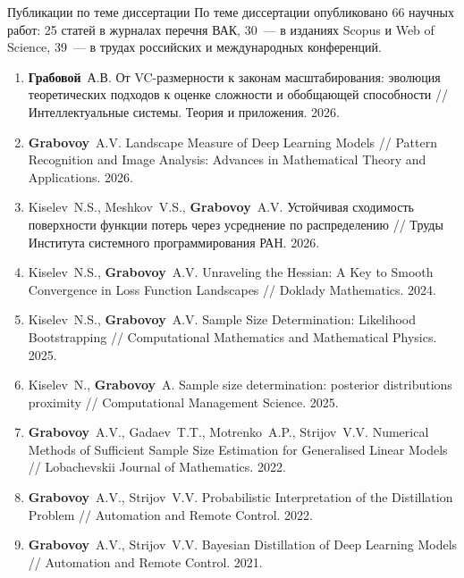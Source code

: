 \documentclass[10pt,pdf,hyperref={unicode}]{beamer}
\begin{document}
\begin{frame}{Публикации по теме диссертации}
\justifying
\scriptsize
\noindent По теме диссертации опубликовано 66 научных работ: 25 статей в журналах перечня ВАК, 30~--- в изданиях Scopus и Web of Science, 39~--- в трудах российских и международных конференций.

\tiny
\setlength{\parindent}{0pt}
\setlength{\parskip}{0pt}
\sloppy
\begin{enumerate}
\setlength{\leftmargin}{1.2em}
\setlength{\itemindent}{0pt}
\setlength{\parsep}{0pt}
\setlength{\itemsep}{-0.4pt}
\setlength{\topsep}{0pt}
    \item \textbf{Грабовой}~А.\;В. От VC-размерности к законам масштабирования: эволюция теоретических подходов к оценке сложности и обобщающей способности // Интеллектуальные системы. Теория и приложения. 2026.
    \item \textbf{Grabovoy}~A.\;V. Landscape Measure of Deep Learning Models // Pattern Recognition and Image Analysis: Advances in Mathematical Theory and Applications. 2026.
    \item Kiselev~N.\;S., Meshkov~V.\;S., \textbf{Grabovoy}~A.\;V. Устойчивая сходимость поверхности функции потерь через усреднение по распределению // Труды Института системного программирования РАН. 2026.
    \item Kiselev~N.\;S., \textbf{Grabovoy}~A.\;V. Unraveling the Hessian: A Key to Smooth Convergence in Loss Function Landscapes // Doklady Mathematics. 2024.
    \item Kiselev~N.\;S., \textbf{Grabovoy}~A.\;V. Sample Size Determination: Likelihood Bootstrapping // Computational Mathematics and Mathematical Physics. 2025.
    \item Kiselev~N., \textbf{Grabovoy}~A. Sample size determination: posterior distributions proximity // Computational Management Science. 2025.
    \item \textbf{Grabovoy}~A.\;V., Gadaev~T.\;T., Motrenko~A.\;P., Strijov~V.\;V. Numerical Methods of Sufficient Sample Size Estimation for Generalised Linear Models // Lobachevskii Journal of Mathematics. 2022.
    \item \textbf{Grabovoy}~A.\;V., Strijov~V.\;V. Probabilistic Interpretation of the Distillation Problem // Automation and Remote Control. 2022.
    \item \textbf{Grabovoy}~A.\;V., Strijov~V.\;V. Bayesian Distillation of Deep Learning Models // Automation and Remote Control. 2021.

\end{enumerate}
\end{frame}
\end{document}

